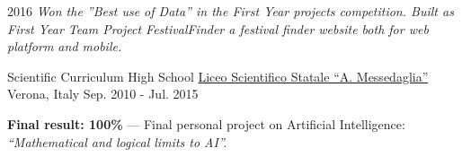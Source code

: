 \begin{cventries}
    \begin{cvsubentries}
      {2016}
      {\em{Won the ”Best use of Data” in the First Year projects competition.} Built as First Year Team Project FestivalFinder a festival finder website both for web platform and mobile.}
    \end{cvsubentries}

    \cventry
      {Scientific Curriculum High School}
      {\href{https://www.messedaglia.gov.it/}{Liceo Scientifico Statale ``A. Messedaglia''}}
      {Verona, Italy}
      {Sep. 2010 - Jul. 2015}
      {
        \begin{cvitems}
          \item {\textbf{Final result: 100\%} --- Final personal project on Artificial Intelligence: \em{“Mathematical and logical limits to AI”}.}
        \end{cvitems}
      }
\end{cventries}
